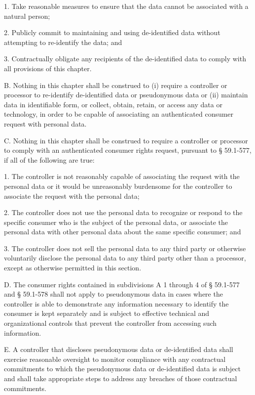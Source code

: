 1. Take reasonable measures to ensure that the data cannot be associated with a natural person;

2. Publicly commit to maintaining and using de-identified data without attempting to re-identify the data; and

3. Contractually obligate any recipients of the de-identified data to comply with all provisions of this chapter.

B. Nothing in this chapter shall be construed to (i) require a controller or processor to re-identify de-identified data or pseudonymous data or (ii) maintain data in identifiable form, or collect, obtain, retain, or access any data or technology, in order to be capable of associating an authenticated consumer request with personal data.

C. Nothing in this chapter shall be construed to require a controller or processor to comply with an authenticated consumer rights request, pursuant to § 59.1-577, if all of the following are true:

1. The controller is not reasonably capable of associating the request with the personal data or it would be unreasonably burdensome for the controller to associate the request with the personal data;

2. The controller does not use the personal data to recognize or respond to the specific consumer who is the subject of the personal data, or associate the personal data with other personal data about the same specific consumer; and

3. The controller does not sell the personal data to any third party or otherwise voluntarily disclose the personal data to any third party other than a processor, except as otherwise permitted in this section.

D. The consumer rights contained in subdivisions A 1 through 4 of § 59.1-577 and § 59.1-578 shall not apply to pseudonymous data in cases where the controller is able to demonstrate any information necessary to identify the consumer is kept separately and is subject to effective technical and organizational controls that prevent the controller from accessing such information.

E. A controller that discloses pseudonymous data or de-identified data shall exercise reasonable oversight to monitor compliance with any contractual commitments to which the pseudonymous data or de-identified data is subject and shall take appropriate steps to address any breaches of those contractual commitments.

